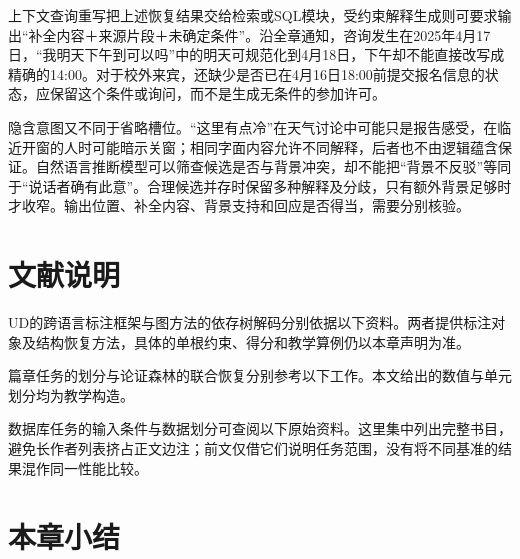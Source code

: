 上下文查询重写把上述恢复结果交给检索或SQL模块，受约束解释生成则可要求输出“补全内容＋来源片段＋未确定条件”。沿全章通知，咨询发生在2025年4月17日，“我明天下午到可以吗”中的明天可规范化到4月18日，下午却不能直接改写成精确的14:00。对于校外来宾，还缺少是否已在4月16日18:00前提交报名信息的状态，应保留这个条件或询问，而不是生成无条件的参加许可。

隐含意图又不同于省略槽位。“这里有点冷”在天气讨论中可能只是报告感受，在临近开窗的人时可能暗示关窗；相同字面内容允许不同解释，后者也不由逻辑蕴含保证。自然语言推断模型可以筛查候选是否与背景冲突，却不能把“背景不反驳”等同于“说话者确有此意”。合理候选并存时保留多种解释及分歧，只有额外背景足够时才收窄。输出位置、补全内容、背景支持和回应是否得当，需要分别核验。

\section*{文献说明}

UD的跨语言标注框架与图方法的依存树解码分别依据以下资料。两者提供标注对象及结构恢复方法，具体的单根约束、得分和教学算例仍以本章声明为准。

\begin{fullwidth}
\raggedright
{}\par
{}
\end{fullwidth}

篇章任务的划分与论证森林的联合恢复分别参考以下工作。本文给出的数值与单元划分均为教学构造。

\begin{fullwidth}
\raggedright
{}\par
{}
\end{fullwidth}

数据库任务的输入条件与数据划分可查阅以下原始资料。这里集中列出完整书目，避免长作者列表挤占正文边注；前文仅借它们说明任务范围，没有将不同基准的结果混作同一性能比较。

\begin{fullwidth}
\small
{}\par\medskip
{}\par\medskip
{}\par\medskip
{}
\end{fullwidth}

\section{本章小结}
\label{sec:nlp-analysis-summary}

